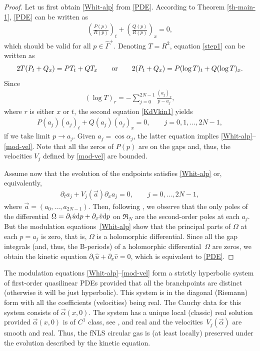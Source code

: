 \documentclass[pdftex]{sigma}
\numberwithin{equation}{section}
\def\ra{\rightarrow}
\newcommand{\G}{\Gamma}
\def\a{\alpha}
\def\G{\Gamma}
\begin{document}
\begin{proof}
Let us first obtain \eqref{Whit-alp}	 from \eqref{PDE}. According to Theorem \ref{th-main-1}, \eqref{PDE} can be written as
\begin{gather}\label{step1}
\left(\frac {P(p)}{R(p)}\right)_t+\left(\frac {Q(p)}{R(p)}\right)_x=0,
\end{gather}
which should be valid for all $p\in\hat\G^+$. Denoting $T=R^2$,
equation \eqref{step1} can be written as
\begin{gather}\label{KdVkin1}
2T(P_t+Q_x)=PT_t+QT_x \qquad {\rm or} \qquad 2(P_t+Q_x)=P(\log T)_t+Q(\log T)_x.
\end{gather}
Since
\begin{gather*}
(\log T)_r=-\sum_{j=0}^{2N-1}\frac{(a_j)_r}{p-a_j},
\end{gather*}
where $r$ is either $x$ or $t$,
the second equation \eqref{KdVkin1} yields
\begin{gather*}%
P(a_j)(a_j)_t+Q(a_j)(a_j)_x=0, \qquad j=0,1,\dots,2N-1,
\end{gather*}
if we take limit $p\ra a_j$. Given $a_j=\cos \a_j$, the latter equation implies \eqref{Whit-alp}--\eqref{mod-vel}. Note that all the zeros of $P(p)$ are on the gaps and, thus, the velocities $V_j$ defined by \eqref{mod-vel} are bounded.

Assume now that the evolution of the endpoints satisfies
\eqref{Whit-alp} or, equivalently,
\begin{gather*}%
\partial_t a_j+V_j(\vec a)\partial_x a_j=0, \qquad j=0,\dots, 2N-1,
\end{gather*}
where $\vec a=(a_0,\dots, a_{2N-1})$.
Then, following \cite{FFM}, we observe that the only poles of the differential $\Omega=\partial_t\hat u{\rm d}p+\partial_x\hat v{\rm d}p$ on $\mathfrak R_N$ are the second-order poles at each $a_j$. But the modulation equations~\eqref{Whit-alp} show that the principal parts of $\Omega$ at each $p=a_j$ is zero, that is, $\Omega$ is a holomorphic differential.
Since all the gap integrals (and, thus, the B-periods) of a holomorphic differential~$\Omega$ are zeros, we obtain the kinetic equation $\partial_t\hat u+\partial_x\hat v=0$, which is equivalent to \eqref{PDE}.
\end{proof}

The modulation equations
\eqref{Whit-alp}--\eqref{mod-vel} form a strictly hyperbolic system of first-order quasilinear PDEs provided that all the branchpoints are distinct (otherwise it will be just hyperbolic). This system is in the diagonal (Riemann) form with all the coefficients (velocities) being real. The Cauchy data for this system consists of $\vec\a(x,0)$. The system has a unique local (classic) real solution provided $\vec\a(x,0)$ is of $C^1$ class, see \cite[Theorem 7.8.1]{DafBook}, and real and the velocities~$V_j(\vec\a)$ are smooth and real. Thus, the fNLS circular gas is (at least locally) preserved under the evolution described by the kinetic equation.
\end{document}
